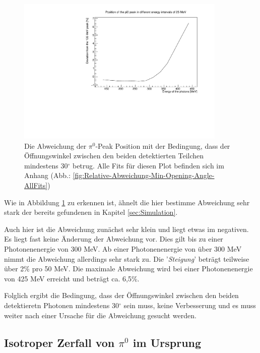 \documentclass[a4paper,11pt,oneside,final,german,openbib,pdftex]{scrbook}
\begin{document}
{\begin{figure}[h!]
	\begin{center}
		\includegraphics[width=100mm]{NewCalib/20171904SimMinOpeningAngleDeviation}
		\caption[Simulation: Symmetrische Photonen; Mindestwinkel zwischen detektierten Photonen]{Die Abweichung der $\pi^0$-Peak Position mit der Bedingung, dass der \"Offnungswinkel zwischen den beiden detektierten Teilchen mindestens 30$^{\circ}$ betrug. Alle Fits f\"ur diesen Plot befinden sich im Anhang (Abb.: \ref{fig:Relative-Abweichung-Min-Opening-Angle-AllFits})}
		\label{fig:Relative-Abweichung-Min-Opening-Angle}
	\end{center}
\end{figure}

Wie in Abbildung \ref{fig:Relative-Abweichung-Min-Opening-Angle} zu erkennen ist, \"ahnelt die hier bestimme Abweichung sehr stark der bereits gefundenen in Kapitel \ref{sec:Simulation}.

Auch hier ist die Abweichung zun\"achst sehr klein und liegt etwas im negativen. Es liegt fast keine \"Anderung der Abweichung vor. Dies gilt bis zu einer Photonenenergie von 300 MeV.
Ab einer Photonenenergie von \"uber 300 MeV nimmt die Abweichung allerdings sehr stark zu. Die '\textit{Steigung}' betr\"agt teilweise \"uber 2\% pro 50 MeV. Die maximale Abweichung wird bei einer Photonenenergie von 425 MeV erreicht und betr\"agt ca. 6,5\%.

Folglich ergibt die Bedingung, dass der \"Offnungswinkel zwischen den beiden detektieretn Photonen mindestens 30$^{\circ}$ sein muss, keine Verbesserung und es muss weiter nach einer Ursache f\"ur die Abweichung gesucht werden.




\subsection{Isotroper Zerfall von $\pi^0$ im Ursprung}
\label{sec:Isotroper-Zerfall-Ursprung}

}
\end{document}
